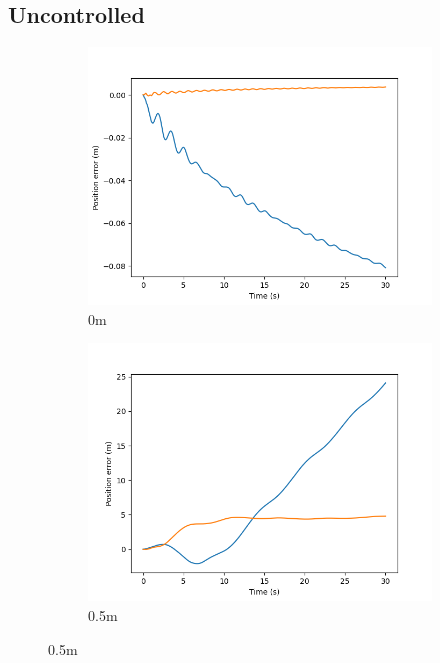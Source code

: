 \documentclass[class=article, crop=false]{standalone}
\begin{document}
\subsection{Uncontrolled}
\begin{figure}
    \centering
    \begin{subfigure}[b]{0.48\textwidth}
        \centering
        \includegraphics{scenario1/rov-0m/0.0m/usv_pos_error_uncontrolled}
        \caption{0m}
        \label{}
    \end{subfigure}
    \hfill
        \begin{subfigure}[b]{0.48\textwidth}
        \centering
        \includegraphics{scenario1/rov-0m/0.5m/usv_pos_error_uncontrolled}
        \caption{0.5m}

\end{subfigure}
\end{figure}
\end{document}
